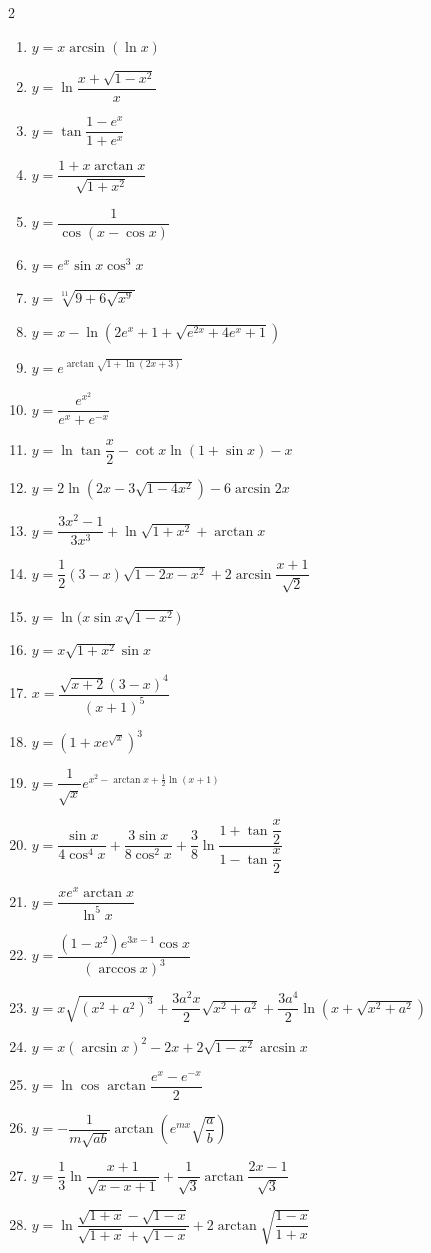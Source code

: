 \begin{multicols}{2}
\begin{enumerate}
  \item $y = x\arcsin(\ln x)$
  \item $y = \ln\dfrac{x + \sqrt{1 - x^2}}{x}$
  \item $y = \tan\dfrac{1 - e^x}{1 + e^x}$
\item $y = \dfrac{1 + x \arctan x}{\sqrt{1 + x^2}}$
  \item $y = \dfrac{1}{\cos(x - \cos x)}$
  \item $y = e^x \sin x \cos^3 x$
  \item $y = \sqrt[11]{9 + 6\sqrt{x^9}}$
  \item $y = x - \ln\!\left(2e^x + 1 + \sqrt{e^{2x} + 4e^x + 1}\right)$
  \item $y = e^{\arctan\sqrt{1 + \ln(2x + 3)}}$
  \item $y = \dfrac{e^{x^2}}{e^x + e^{-x}}$
  \item $y = \ln\tan\dfrac{x}{2} - \cot x \ln(1 + \sin x) - x$
  \item $y = 2\ln\!\left(2x - 3\sqrt{1 - 4x^2}\right) - 6\arcsin 2x$
  \item $y = \dfrac{3x^2 - 1}{3x^3} + \ln\sqrt{1 + x^2} + \arctan x$
  \item $y = \dfrac{1}{2}(3 - x)\sqrt{1 - 2x - x^2} + 2\arcsin\dfrac{x + 1}{\sqrt{2}}$
  \item $y = \ln\!\big(x\sin x\sqrt{1 - x^2}\big)$
  \item $y = x\sqrt{1 + x^2}\sin x$
  \item $x = \dfrac{\sqrt{x + 2}(3 - x)^4}{(x + 1)^5}$
  \item $y = \left(1 + x e^{\sqrt{x}}\right)^3$
  \item $y = \dfrac{1}{\sqrt{x}}e^{x^2 - \arctan x + \frac{1}{2}\ln(x + 1)}$
  \item $y = \dfrac{\sin x}{4\cos^4 x} + \dfrac{3\sin x}{8\cos^2 x} + \dfrac{3}{8}\ln\dfrac{1 + \tan\dfrac{x}{2}}{1 - \tan\dfrac{x}{2}}$
  \item $y = \dfrac{x e^x \arctan x}{\ln^5 x}$
  \item $y = \dfrac{(1 - x^2)e^{3x - 1}\cos x}{(\arccos x)^3}$
  \item $y = x\sqrt{(x^2 + a^2)^3} + \dfrac{3a^2 x}{2}\sqrt{x^2 + a^2} + \dfrac{3a^4}{2}\ln\!\left(x + \sqrt{x^2 + a^2}\right)$
  \item $y = x(\arcsin x)^2 - 2x + 2\sqrt{1 - x^2}\arcsin x$
  \item $y = \ln\cos\arctan\dfrac{e^x - e^{-x}}{2}$
  \item $y = -\dfrac{1}{m\sqrt{ab}}\arctan\!\left(e^{mx}\sqrt{\dfrac{a}{b}}\right)$
  \item $y = \dfrac{1}{3}\ln\dfrac{x + 1}{\sqrt{x - x + 1}} + \dfrac{1}{\sqrt{3}}\arctan\dfrac{2x - 1}{\sqrt{3}}$
  \item $y = \ln\dfrac{\sqrt{1 + x} - \sqrt{1 - x}}{\sqrt{1 + x} + \sqrt{1 - x}} + 2\arctan\sqrt{\dfrac{1 - x}{1 + x}}$
\end{enumerate}
\end{multicols}